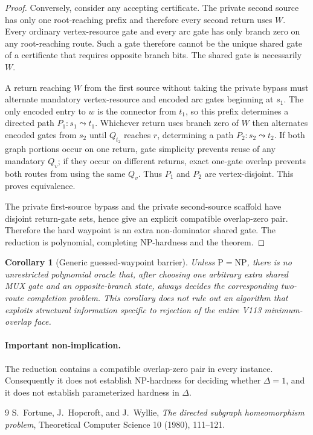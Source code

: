 \documentclass[11pt]{article}
\newtheorem{corollary}{Corollary}
\begin{document}
\begin{proof}
Conversely, consider any accepting certificate.  The private second source
has only one root-reaching prefix and therefore every second return uses $W$.
Every ordinary vertex-resource gate and every arc gate has only branch zero on
any root-reaching route.  Such a gate therefore cannot be the unique shared
gate of a certificate that requires opposite branch bits.  The shared gate is
necessarily $W$.

A return reaching $W$ from the first source without taking the private bypass
must alternate mandatory vertex-resource and encoded arc gates beginning at
$s_1$.  The only encoded entry to $w$ is the connector from $t_1$, so this
prefix determines a directed path $P_1:s_1\leadsto t_1$.  Whichever return
uses branch zero of $W$ then alternates encoded gates from $s_2$ until
$Q_{t_2}$ reaches $r$, determining a path $P_2:s_2\leadsto t_2$.  If both
graph portions occur on one return, gate simplicity prevents reuse of any
mandatory $Q_v$; if they occur on different returns, exact one-gate overlap
prevents both routes from using the same $Q_v$.  Thus $P_1$ and $P_2$ are
vertex-disjoint.  This proves equivalence.

The private first-source bypass and the private second-source scaffold have
disjoint return-gate sets, hence give an explicit compatible overlap-zero pair.
Therefore the hard waypoint is an extra non-dominator shared gate.  The
reduction is polynomial, completing NP-hardness and the theorem.
\end{proof}

\begin{corollary}[Generic guessed-waypoint barrier]
Unless $\mathrm{P}=\mathrm{NP}$, there is no unrestricted polynomial oracle
that, after choosing one arbitrary extra shared MUX gate and an opposite-branch
state, always decides the corresponding two-route completion problem.  This
corollary does not rule out an algorithm that exploits structural information
specific to rejection of the entire V113 minimum-overlap face.
\end{corollary}

\paragraph{Important non-implication.}
The reduction contains a compatible overlap-zero pair in every instance.
Consequently it does not establish NP-hardness for deciding whether
$\Delta=1$, and it does not establish parameterized hardness in $\Delta$.

\begin{thebibliography}{9}
S.~Fortune, J.~Hopcroft, and J.~Wyllie,
\emph{The directed subgraph homeomorphism problem},
Theoretical Computer Science 10 (1980), 111--121.
\end{thebibliography}
\end{document}
